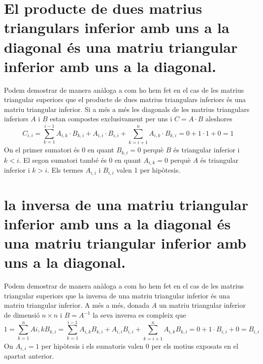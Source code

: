 \documentclass[a4paper,10pt]{article}
\renewcommand{\*}{\cdot}
\begin{document}
\section{El producte de dues matrius triangulars inferior amb uns a la diagonal és una matriu triangular inferior amb uns a la diagonal.}
Podem demostrar de manera anàloga a com ho hem fet en el cas de les matrius triangular superiors que el producte de dues matrius triangulars inferiors és una matriu
triangular inferior. Si a més a més les diagonals de les matrius triangulars inferiors $A$ i $B$ estan compostes exclusivament per uns i $C=A\*B$ aleshores
$$C_{i,i}=\sum_{k=1}^{i-1}A_{i,k}\*B_{k,i}+A_{i,i}\*B_{i,i}+\sum_{k=i+1}^nA_{i,k}\*B_{k,i}=0+1\*1+0=1$$
On el primer sumatori és 0 en quant $B_{k,i}=0$ perquè $B$ és triangular inferior i $k<i$. El segon sumatori també és 0 en quant $A_{i,k}=0$ perquè $A$ és triangular
inferior i  $k>i$. Els termes $A_{i,i}$ i $B_{i,i}$ valen 1 per hipòtesis.
\section{la inversa de una matriu triangular inferior amb uns a la diagonal és una matriu triangular inferior amb uns a la diagonal.}
Podem demostrar de manera anàloga a com ho hem fet en el cas de les matrius triangular superiors que la inversa de una matriu triangular inferior és una matriu triangular
inferior. A més a més, donada $A$ un matriu triangular inferior de dimensió $n\times n$ i $B=A^{-1}$ la seva inversa es compleix que
$$1=\sum_{k=1}^nA{i,k}B_{k,i}=\sum_{k=1}^{i-1}A_{i,k}B_{k,i}+A_{i,i}B_{i,i}+\sum_{k=i+1}^{n}A_{i,k}B_{k,i}=0+1\*B_{i,i}+0=B_{i,i}$$
On $A_{i,i}=1$ per hipòtesis i els sumatoris valen 0 per els motius exposats en el apartat anterior.
\end{document}
